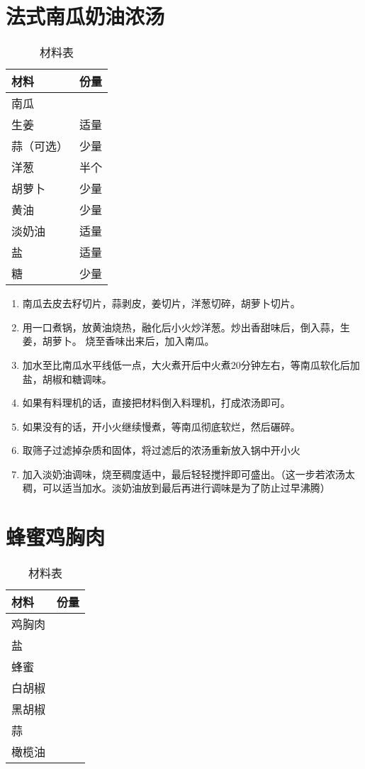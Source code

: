 \section{法式南瓜奶油浓汤}

\begin{table}[H]
    \centering
    \begin{tabular}{|l||c|}\hline
     \textbf{材料}    &  \textbf{份量}\\ \hline\hline
    南瓜 &  \\ \hline
    生姜 & 适量 \\ \hline
    蒜（可选） & 少量 \\ \hline
    洋葱 &  半个 \\ \hline
    胡萝卜 & 少量\\ \hline
    黄油 & 少量\\ \hline
    淡奶油 & 适量\\ \hline
    盐 & 适量\\ \hline
    糖 & 少量\\ \hline
    \end{tabular}
    \caption{材料表}
\end{table}

\begin{enumerate}
    \item 南瓜去皮去籽切片，蒜剥皮，姜切片，洋葱切碎，胡萝卜切片。
    \item 用一口煮锅，放黄油烧热，融化后小火炒洋葱。炒出香甜味后，倒入蒜，生姜，胡萝卜。
烧至香味出来后，加入南瓜。
    \item 加水至比南瓜水平线低一点，大火煮开后中火煮20分钟左右，等南瓜软化后加盐，胡椒和糖调味。
    \item 如果有料理机的话，直接把材料倒入料理机，打成浓汤即可。
    \item 如果没有的话，开小火继续慢煮，等南瓜彻底软烂，然后碾碎。
    \item 取筛子过滤掉杂质和固体，将过滤后的浓汤重新放入锅中开小火
    \item 加入淡奶油调味，烧至稠度适中，最后轻轻搅拌即可盛出。（这一步若浓汤太稠，可以适当加水。淡奶油放到最后再进行调味是为了防止过早沸腾）
\end{enumerate}


\section{蜂蜜鸡胸肉}

\begin{table}[H]
    \centering
    \begin{tabular}{|l||c|}\hline
     \textbf{材料}    &  \textbf{份量}\\ \hline\hline
    鸡胸肉 &  \\ \hline
    盐 &  \\ \hline
    蜂蜜 &  \\ \hline
    白胡椒 &  \\ \hline
    黑胡椒 & \\ \hline
    蒜 & \\ \hline
    橄榄油 & \\ \hline
    \end{tabular}
    \caption{材料表}
\end{table}

